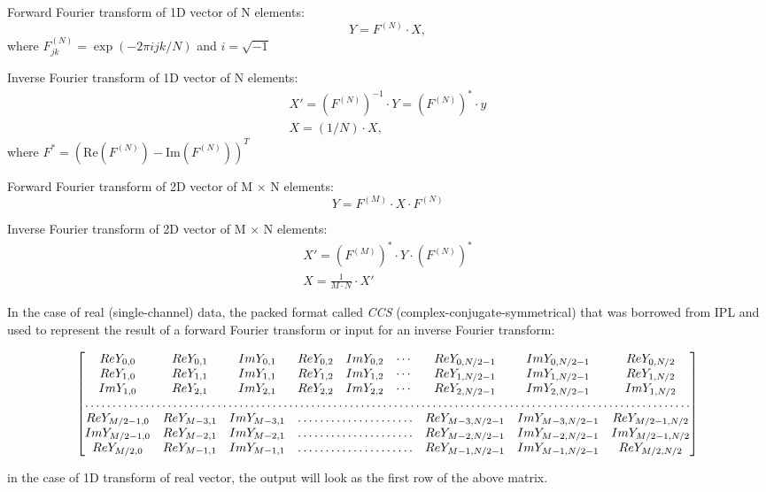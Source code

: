 Forward Fourier transform of 1D vector of N elements:
\[Y = F^{(N)} \cdot X,\]
where $F^{(N)}_{jk}=\exp(-2\pi i j k/N)$ and $i=\sqrt{-1}$

Inverse Fourier transform of 1D vector of N elements:
\[
\begin{array}{l}
X'= \left(F^{(N)}\right)^{-1} \cdot Y = \left(F^{(N)}\right)^* \cdot y \\
X = (1/N) \cdot X,
\end{array}
\]
where $F^*=\left(\textrm{Re}(F^{(N)})-\textrm{Im}(F^{(N)})\right)^T$

Forward Fourier transform of 2D vector of M $\times$ N elements:
\[Y = F^{(M)} \cdot X \cdot F^{(N)}\]

Inverse Fourier transform of 2D vector of M $\times$ N elements:
\[
\begin{array}{l}
X'= \left(F^{(M)}\right)^* \cdot Y \cdot \left(F^{(N)}\right)^*\\
X = \frac{1}{M \cdot N} \cdot X'
\end{array}
\]

In the case of real (single-channel) data, the packed format called \emph{CCS} (complex-conjugate-symmetrical) that was borrowed from IPL and used to represent the result of a forward Fourier transform or input for an inverse Fourier transform:

\[\begin{bmatrix}
Re Y_{0,0} & Re Y_{0,1} & Im Y_{0,1} & Re Y_{0,2} & Im Y_{0,2} & \cdots & Re Y_{0,N/2-1} & Im Y_{0,N/2-1} & Re Y_{0,N/2} \\
Re Y_{1,0} & Re Y_{1,1} & Im Y_{1,1} & Re Y_{1,2} & Im Y_{1,2} & \cdots & Re Y_{1,N/2-1} & Im Y_{1,N/2-1} & Re Y_{1,N/2} \\
Im Y_{1,0} & Re Y_{2,1} & Im Y_{2,1} & Re Y_{2,2} & Im Y_{2,2} & \cdots & Re Y_{2,N/2-1} & Im Y_{2,N/2-1} & Im Y_{1,N/2} \\
\hdotsfor{9} \\
Re Y_{M/2-1,0} &  Re Y_{M-3,1}  & Im Y_{M-3,1} & \hdotsfor{3} & Re Y_{M-3,N/2-1} & Im Y_{M-3,N/2-1}& Re Y_{M/2-1,N/2} \\
Im Y_{M/2-1,0} &  Re Y_{M-2,1}  & Im Y_{M-2,1} & \hdotsfor{3} & Re Y_{M-2,N/2-1} & Im Y_{M-2,N/2-1}& Im Y_{M/2-1,N/2} \\
Re Y_{M/2,0}  &  Re Y_{M-1,1} &  Im Y_{M-1,1} & \hdotsfor{3} & Re Y_{M-1,N/2-1} & Im Y_{M-1,N/2-1}& Re Y_{M/2,N/2}
\end{bmatrix}
\]

in the case of 1D transform of real vector, the output will look as the first row of the above matrix. 

